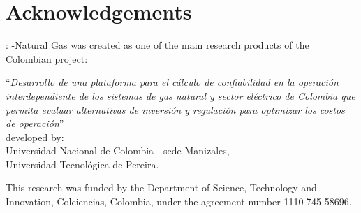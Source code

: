 \chapter{Acknowledgements}
\label{chap:ack}

\mpng{}: \matpower{}-Natural Gas was created as one of the main research products of the Colombian project:\\

\begin{center}
``\textit{Desarrollo de una plataforma para el cálculo de confiabilidad en la operación interdependiente de los sistemas de gas natural y sector eléctrico de Colombia que permita evaluar alternativas de inversión y regulación para optimizar los costos de operación}''\\
 
\vspace{1cm} 
developed by:\\

\vspace{1cm}
Universidad Nacional de Colombia - sede Manizales,\\
Universidad Tecnológica de Pereira.
\end{center} 

\vspace{1cm}
\noindent This research was funded by the Department of Science, Technology and Innovation, Colciencias, Colombia, under the agreement number 1110-745-58696. 



